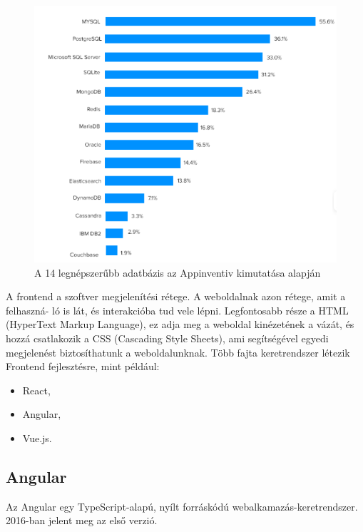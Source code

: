 \begin{figure}[h]
\centering
\includegraphics[scale=0.6]{images/top14_database.png}
\caption{A 14 legnépszerűbb adatbázis az Appinventiv kimutatása alapján \cite{databases}}
\label{fig:Adatbázisok}
\end{figure}
\newpage


A frontend a szoftver megjelenítési rétege. A weboldalnak azon rétege, amit a felhaszná-
ló is lát, és interakcióba tud vele lépni. Legfontosabb része a HTML (HyperText Markup Language), ez adja meg a weboldal kinézetének a vázát, és hozzá csatlakozik a CSS (Cascading Style Sheets), ami segítségével egyedi megjelenést biztosíthatunk a weboldalunknak. Több fajta keretrendszer létezik Frontend fejlesztésre, mint például:

\begin{itemize}
\item React,
\item Angular,
\item Vue.js.
\end{itemize}


\subsection{Angular}

Az Angular \cite{Angular} egy TypeScript-alapú, nyílt forráskódú webalkamazás-keretrendszer. 2016-ban jelent meg az első verzió.

